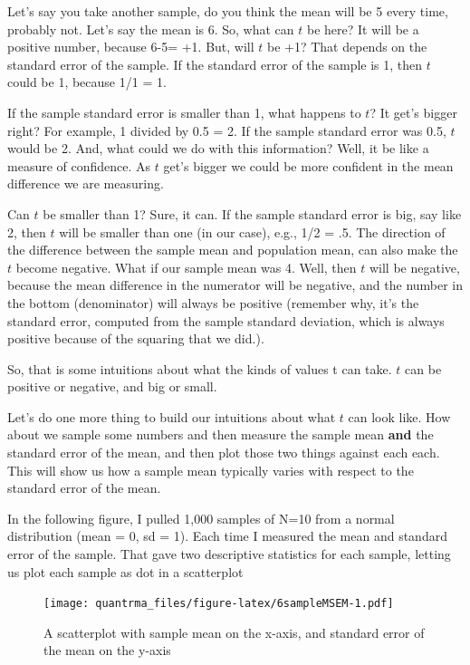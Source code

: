 \documentclass[
]{book}
\begin{document}
Let's say you take another sample, do you think the mean will be 5 every time, probably not. Let's say the mean is 6. So, what can \(t\) be here? It will be a positive number, because 6-5= +1. But, will \(t\) be +1? That depends on the standard error of the sample. If the standard error of the sample is 1, then \(t\) could be 1, because 1/1 = 1.

If the sample standard error is smaller than 1, what happens to \(t\)? It get's bigger right? For example, 1 divided by 0.5 = 2. If the sample standard error was 0.5, \(t\) would be 2. And, what could we do with this information? Well, it be like a measure of confidence. As \(t\) get's bigger we could be more confident in the mean difference we are measuring.

Can \(t\) be smaller than 1? Sure, it can. If the sample standard error is big, say like 2, then \(t\) will be smaller than one (in our case), e.g., 1/2 = .5. The direction of the difference between the sample mean and population mean, can also make the \(t\) become negative. What if our sample mean was 4. Well, then \(t\) will be negative, because the mean difference in the numerator will be negative, and the number in the bottom (denominator) will always be positive (remember why, it's the standard error, computed from the sample standard deviation, which is always positive because of the squaring that we did.).

So, that is some intuitions about what the kinds of values t can take. \(t\) can be positive or negative, and big or small.

Let's do one more thing to build our intuitions about what \(t\) can look like. How about we sample some numbers and then measure the sample mean \textbf{and} the standard error of the mean, and then plot those two things against each each. This will show us how a sample mean typically varies with respect to the standard error of the mean.

In the following figure, I pulled 1,000 samples of N=10 from a normal distribution (mean = 0, sd = 1). Each time I measured the mean and standard error of the sample. That gave two descriptive statistics for each sample, letting us plot each sample as dot in a scatterplot

\begin{figure}
\centering
\texttt{[image: quantrma\_files/figure-latex/6sampleMSEM-1.pdf]}
\caption{\label{fig:6sampleMSEM}A scatterplot with sample mean on the x-axis, and standard error of the mean on the y-axis}
\end{figure}
\end{document}
